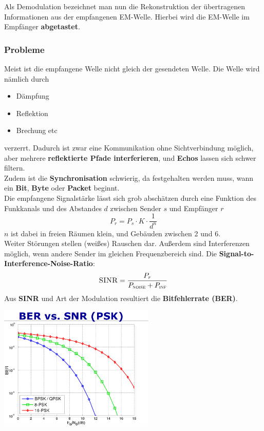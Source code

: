 \documentclass[a4paper]{article}
\begin{document}
Als Demodulation bezeichnet man nun die Rekonstruktion der übertragenen Informationen aus der empfangenen EM-Welle. Hierbei wird die EM-Welle im Empfänger \textbf{abgetastet}.
\subsubsection{Probleme}
Meist ist die empfangene Welle nicht gleich der gesendeten Welle. Die Welle wird nämlich durch
\begin{itemize}
	\item Dämpfung
	\item Reflektion
	\item Brechung etc
\end{itemize}
verzerrt. Dadurch ist zwar eine Kommunikation ohne Sichtverbindung möglich, aber mehrere \textbf{reflektierte Pfade interferieren}, und \textbf{Echos} lassen sich schwer filtern.\\

Zudem ist die \textbf{Synchronisation} schwierig, da festgehalten werden muss, wann ein \textbf{Bit}, \textbf{Byte} oder \textbf{Packet} beginnt.\\

Die empfangene Signalstärke lässt sich grob abschätzen durch eine Funktion des Funkkanals und des Abstandes $d$ zwischen Sender $s$ und Empfänger $r$
$$P_r = P_s \cdot K \cdot \frac{1}{d^n}$$
$n$ ist dabei in freien Räumen klein, und Gebäuden zwischen 2 und 6.\\

Weiter Störungen stellen (weißes) Rauschen dar. Außerdem sind Interferenzen möglich, wenn andere Sender im gleichen Frequenzbereich sind. Die \textbf{Signal-to-Interference-Noise-Ratio}:
$$\textsc{SINR} = \dfrac{P_r}{P_{\textsc{noise}} + P_{\textsc{inf}}}$$
Aus \textbf{SINR} und Art der Modulation resultiert die \textbf{Bitfehlerrate (BER)}.
\begin{center}
	\includegraphics[height = 6cm]{BER-PSK.png}
\end{center}
\end{document}
